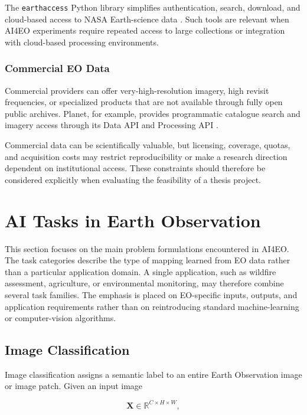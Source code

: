 \documentclass[11pt,a4paper]{article}
\begin{document}
The \texttt{earthaccess} Python library simplifies authentication,
search, download, and cloud-based access to NASA Earth-science data
\cite{nasa_earthaccess}. Such tools are relevant when AI4EO experiments
require repeated access to large collections or integration with
cloud-based processing environments.

\subsubsection{Commercial EO Data}

Commercial providers can offer very-high-resolution imagery, high
revisit frequencies, or specialized products that are not available
through fully open public archives. Planet, for example, provides
programmatic catalogue search and imagery access through its Data API
and Processing API \cite{planet_data_api,planet_processing_api}.

Commercial data can be scientifically valuable, but licensing,
coverage, quotas, and acquisition costs may restrict reproducibility or
make a research direction dependent on institutional access. These
constraints should therefore be considered explicitly when evaluating
the feasibility of a thesis project.

\section{AI Tasks in Earth Observation}

This section focuses on the main problem formulations encountered in
AI4EO. The task categories describe the type of mapping learned from EO
data rather than a particular application domain. A single application,
such as wildfire assessment, agriculture, or environmental monitoring,
may therefore combine several task families. The emphasis is placed on
EO-specific inputs, outputs, and application requirements rather than on
reintroducing standard machine-learning or computer-vision algorithms.

\subsection{Image Classification}

Image classification assigns a semantic label to an entire Earth
Observation image or image patch. Given an input image

\[
\mathbf{X}
\in
\mathbb{R}^{C\times H\times W},
\]
\end{document}
